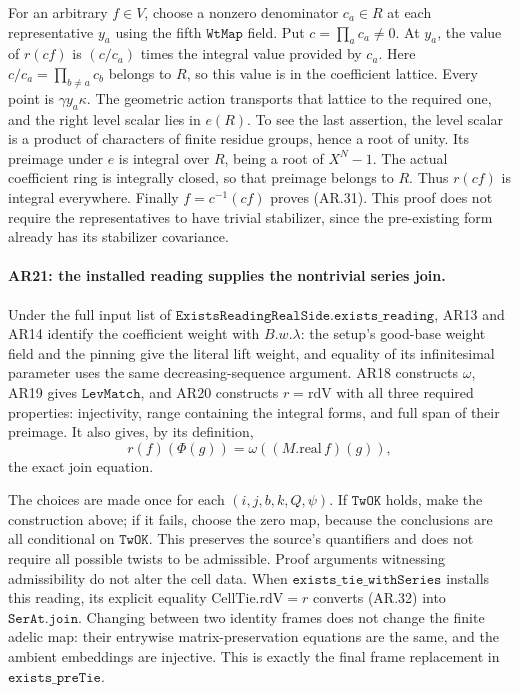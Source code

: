 For an arbitrary $f\in V$, choose a nonzero denominator $c_a\in R$
at each representative $y_a$ using the fifth $\texttt{WtMap}$ field.
Put $c=\prod_a c_a\ne0$. At $y_a$, the value of $r(cf)$ is
$(c/c_a)$ times the integral value provided by $c_a$. Here
$c/c_a=\prod_{b\ne a}c_b$ belongs to $R$, so this value is in the
coefficient lattice. Every point is $\gamma y_a\kappa$.
The geometric action transports that lattice to the required
one, and the right level scalar lies in $e(R)$. To see the last
assertion, the level scalar is a product of characters of finite
residue groups, hence a root of unity. Its preimage under $e$ is
integral over $R$, being a root of $X^N-1$. The actual coefficient
ring is integrally closed, so that preimage belongs to $R$.
Thus $r(cf)$ is integral everywhere. Finally $f=c^{-1}(cf)$ proves
(AR.31). This proof does not require the representatives to have
trivial stabilizer, since the pre-existing form already has its
stabilizer covariance.

\paragraph{AR21: the installed reading supplies the nontrivial series join.}
Under the full input list of
$\texttt{ExistsReadingRealSide.exists\_reading}$, AR13 and AR14
identify the coefficient weight with $B.w.\lambda$:
the setup's good-base weight field and the pinning give the
literal lift weight, and equality of its infinitesimal parameter
uses the same decreasing-sequence argument.
AR18 constructs $\omega$, AR19 gives $\texttt{LevMatch}$, and AR20
constructs $r=\mathrm{rdV}$ with all three required properties:
injectivity, range containing the integral forms, and full span
of their preimage. It also gives, by its definition,
\[
 r(f)(\Phi(g))=\omega((M.\mathrm{real}\,f)(g)),
                                                               \tag{AR.32}
\]
the exact join equation.

The choices are made once for each $(i,j,b,k,Q,\psi)$. If
$\texttt{TwOK}$ holds, make the construction above; if it fails,
choose the zero map, because the conclusions are all conditional
on $\texttt{TwOK}$. This preserves the source's quantifiers and
does not require all possible twists to be admissible. Proof
arguments witnessing admissibility do not alter the cell data.
When $\texttt{exists\_tie\_withSeries}$ installs this reading, its
explicit equality $\mathrm{CellTie.rdV}=r$ converts (AR.32) into
$\texttt{SerAt.join}$. Changing between two identity frames does
not change the finite adelic map: their entrywise matrix-preservation
equations are the same, and the ambient embeddings are injective.
This is exactly the final frame replacement in
$\texttt{exists\_preTie}$.

